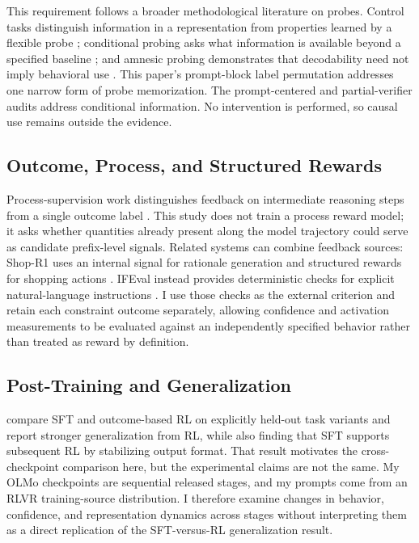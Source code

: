 \documentclass[manuscript,screen,nonacm]{acmart}
\begin{document}
This requirement follows a broader methodological literature on probes.
Control tasks distinguish information in a representation from properties
learned by a flexible probe \citep{hewitt2019probes}; conditional probing asks
what information is available beyond a specified baseline
\citep{hewitt2021conditional}; and amnesic probing demonstrates that
decodability need not imply behavioral use \citep{elazar2021amnesic}. This
paper's prompt-block label permutation addresses one narrow form of probe
memorization. The prompt-centered and partial-verifier audits address
conditional information. No intervention is performed, so causal use remains
outside the evidence.

\subsection{Outcome, Process, and Structured Rewards}

Process-supervision work distinguishes feedback on intermediate reasoning steps
from a single outcome label \citep{lightman2023verify}. This study does not
train a process reward model; it asks whether quantities already present along
the model trajectory could serve as candidate prefix-level signals. Related
systems can combine feedback sources: Shop-R1 uses an internal signal for
rationale generation and structured rewards for shopping actions
\citep{zhang2025shopr1}. IFEval instead provides deterministic checks for
explicit natural-language instructions \citep{zhou2023ifeval}. I use those
checks as the external criterion and retain each constraint outcome separately,
allowing confidence and activation measurements to be evaluated against an
independently specified behavior rather than treated as reward by definition.

\subsection{Post-Training and Generalization}

\citet{chu2025sft} compare SFT and outcome-based RL on explicitly held-out task
variants and report stronger generalization from RL, while also finding that
SFT supports subsequent RL by stabilizing output format. That result motivates
the cross-checkpoint comparison here, but the experimental claims are not the
same. My OLMo checkpoints are sequential released stages, and my prompts come
from an RLVR training-source distribution. I therefore examine changes in
behavior, confidence, and representation dynamics across stages without
interpreting them as a direct replication of the SFT-versus-RL generalization
result.
\end{document}
